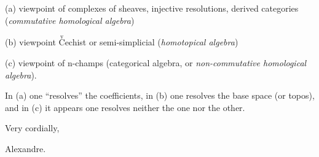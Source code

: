 (a) viewpoint of complexes of sheaves, injective resolutions, derived
categories (\textit{commutative homological algebra})

(b) viewpoint $\overset{\mathrm v}{\mathrm C}$echist or semi-simplicial (\textit{homotopical algebra})

(c) viewpoint of n-champs (categorical algebra, or \textit{non-commutative homological
algebra}).

In (a) one ``resolves'' the coefficients, in (b) one resolves the base
space (or topos), and in (c) it appears one resolves neither the one nor the
other.

Very cordially,

Alexandre.


